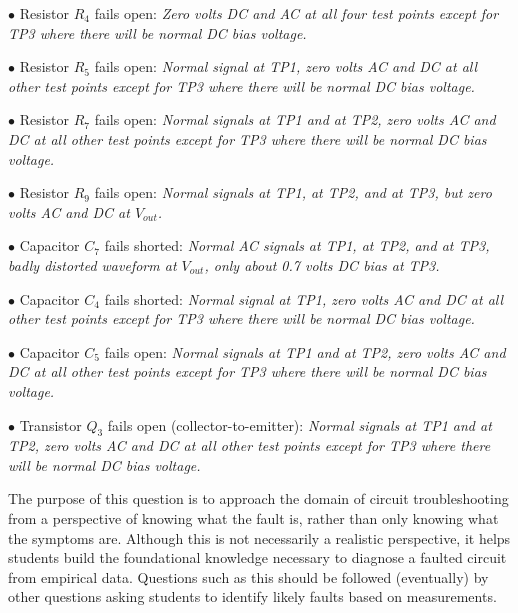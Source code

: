 \medskip
\item{$\bullet$} Resistor $R_4$ fails open: {\it Zero volts DC and AC at all four test points except for TP3 where there will be normal DC bias voltage.}
\vskip 5pt
\item{$\bullet$} Resistor $R_5$ fails open: {\it Normal signal at TP1, zero volts AC and DC at all other test points except for TP3 where there will be normal DC bias voltage.}
\vskip 5pt
\item{$\bullet$} Resistor $R_7$ fails open: {\it Normal signals at TP1 and at TP2, zero volts AC and DC at all other test points except for TP3 where there will be normal DC bias voltage.}
\vskip 5pt
\item{$\bullet$} Resistor $R_9$ fails open: {\it Normal signals at TP1, at TP2, and at TP3, but zero volts AC and DC at $V_{out}$.}
\vskip 5pt
\item{$\bullet$} Capacitor $C_7$ fails shorted: {\it Normal AC signals at TP1, at TP2, and at TP3, badly distorted waveform at $V_{out}$, only about 0.7 volts DC bias at TP3.}
\vskip 5pt
\item{$\bullet$} Capacitor $C_4$ fails shorted: {\it Normal signal at TP1, zero volts AC and DC at all other test points except for TP3 where there will be normal DC bias voltage.}
\vskip 5pt
\item{$\bullet$} Capacitor $C_5$ fails open: {\it Normal signals at TP1 and at TP2, zero volts AC and DC at all other test points except for TP3 where there will be normal DC bias voltage.}
\vskip 5pt
\item{$\bullet$} Transistor $Q_3$ fails open (collector-to-emitter): {\it Normal signals at TP1 and at TP2, zero volts AC and DC at all other test points except for TP3 where there will be normal DC bias voltage.}
\medskip







The purpose of this question is to approach the domain of circuit troubleshooting from a perspective of knowing what the fault is, rather than only knowing what the symptoms are.  Although this is not necessarily a realistic perspective, it helps students build the foundational knowledge necessary to diagnose a faulted circuit from empirical data.  Questions such as this should be followed (eventually) by other questions asking students to identify likely faults based on measurements.




